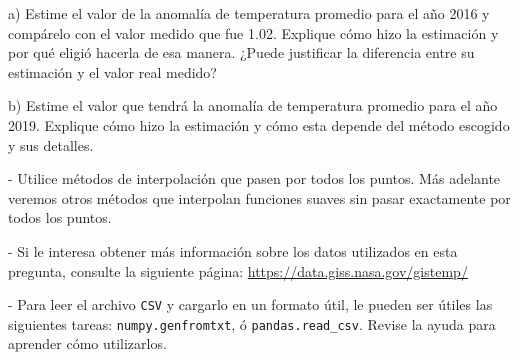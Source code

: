 \documentclass[letter, 11pt]{article}
\begin{document}
\vspace{0.5em}
\noindent a) Estime el valor de la anomalía de temperatura promedio para el año
2016 y compárelo con el valor medido que fue 1.02. Explique cómo hizo la
estimación y por qué eligió hacerla de esa manera. ¿Puede justificar la
diferencia entre su estimación y el valor real medido?

\vspace{0.5em}
\noindent b) Estime el valor que tendrá la anomalía de temperatura promedio
para el año 2019. Explique cómo hizo la estimación y cómo esta depende del
método escogido y sus detalles.

\begin{ayuda}
  - Utilice métodos de interpolación que pasen por todos los puntos. Más
  adelante veremos otros métodos que interpolan funciones suaves sin pasar
  exactamente por todos los puntos.

  \noindent- Si le interesa obtener más información sobre los datos utilizados
  en esta pregunta, consulte la siguiente página:
  \href{https://data.giss.nasa.gov/gistemp/}{https://data.giss.nasa.gov/gistemp/}

  \noindent- Para leer el archivo \texttt{CSV} y cargarlo en un formato útil,
  le pueden ser útiles las siguientes tareas: \texttt{numpy.genfromtxt}, ó
  \texttt{pandas.read\_csv}. Revise la ayuda para aprender cómo utilizarlos.
\end{ayuda}

\end{document}

